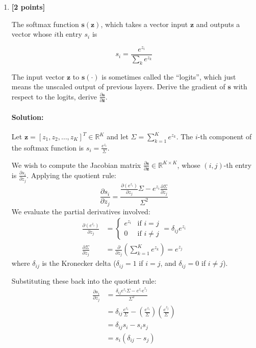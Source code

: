 \documentclass[11pt,english]{article}
\begin{document}
\begin{enumerate}
\newpage

\item
\textbf{[2 points]}

The softmax function $\mathbf{s}(\mathbf{z})$, which takes a vector input $\mathbf{z}$ and outputs a vector whose $i$th entry $s_i$ is

\begin{equation}
s_i = \frac{e^{z_{i}}}{\sum_{k} e^{z_{k}}}
\end{equation}

The input vector $\mathbf{z}$ to $\mathbf{s}(\cdot)$ is sometimes called the ``logits'', which just means the unscaled output of previous layers. Derive the gradient of $\mathbf{s}$ with respect to the logits, \ie derive $\frac{\partial \mathbf{s}}{\partial \mathbf{z}}$. 

\paragraph{Solution:}

Let $\mathbf{z} = [z_1, z_2, \dots, z_K]^T \in \mathbb{R}^K$ and let $\Sigma = \sum_{k=1}^K e^{z_k}$. The $i$-th component of the softmax function is $s_i = \frac{e^{z_i}}{\Sigma}$.

We wish to compute the Jacobian matrix $\frac{\partial \mathbf{s}}{\partial \mathbf{z}} \in \mathbb{R}^{K \times K}$, whose $(i, j)$-th entry is $\frac{\partial s_i}{\partial z_j}$. Applying the quotient rule:
\begin{equation}
    \frac{\partial s_i}{\partial z_j} = \frac{\frac{\partial (e^{z_i})}{\partial z_j} \Sigma - e^{z_i} \frac{\partial \Sigma}{\partial z_j}}{\Sigma^2}
\end{equation}
We evaluate the partial derivatives involved:
\begin{align}
    \frac{\partial (e^{z_i})}{\partial z_j} &= \begin{cases} e^{z_i} & \text{if } i = j \\ 0 & \text{if } i \neq j \end{cases} = \delta_{ij} e^{z_i} \\
    \frac{\partial \Sigma}{\partial z_j} &= \frac{\partial}{\partial z_j} \left( \sum_{k=1}^K e^{z_k} \right) = e^{z_j}
\end{align}
where $\delta_{ij}$ is the Kronecker delta ($\delta_{ij} = 1$ if $i = j$, and $\delta_{ij} = 0$ if $i \neq j$).

Substituting these back into the quotient rule:
\begin{align}
    \frac{\partial s_i}{\partial z_j} &= \frac{\delta_{ij} e^{z_i} \Sigma - e^{z_i} e^{z_j}}{\Sigma^2} \\
    &= \delta_{ij} \frac{e^{z_i}}{\Sigma} - \left(\frac{e^{z_i}}{\Sigma}\right) \left(\frac{e^{z_j}}{\Sigma}\right) \\
    &= \delta_{ij} s_i - s_i s_j \\
    &= s_i (\delta_{ij} - s_j)
\end{align}


\end{enumerate}
\end{document}
